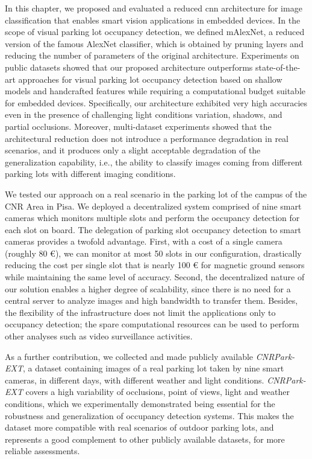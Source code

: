 In this chapter, we proposed and evaluated a reduced \acrlong{cnn} architecture for image classification that enables smart vision applications in embedded devices.
In the scope of visual parking lot occupancy detection, we defined mAlexNet, a reduced version of the famous AlexNet classifier, which is obtained by pruning layers and reducing the number of parameters of the original architecture.
Experiments on public datasets showed that our proposed architecture outperforms state-of-the-art approaches for visual parking lot occupancy detection based on shallow models and handcrafted features while requiring a computational budget suitable for embedded devices.
Specifically, our architecture exhibited very high accuracies even in the presence of challenging light conditions variation, shadows, and partial occlusions.
Moreover, multi-dataset experiments showed that the architectural reduction does not introduce a performance degradation in real scenarios, and it produces only a slight acceptable degradation of the generalization capability, i.e., the ability to classify images coming from different parking lots with different imaging conditions.

We tested our approach on a real scenario in the parking lot of the campus of the CNR Area in Pisa.
We deployed a decentralized system comprised of nine smart cameras which monitors multiple slots and perform the occupancy detection for each slot on board.
The delegation of parking slot occupancy detection to smart cameras provides a twofold advantage.
First, with a cost of a single camera (roughly 80 \euro{}), we can monitor at most 50 slots in our configuration, drastically reducing the cost per single slot that is nearly 100 \euro{} for magnetic ground sensors while maintaining the same level of accuracy.
Second, the decentralized nature of our solution enables a higher degree of scalability, since there is no need for a central server to analyze images and high bandwidth to transfer them.
Besides, the flexibility of the infrastructure does not limit the applications only to occupancy detection;
the spare computational resources can be used to perform other analyses such as video surveillance activities.

As a further contribution, we collected and made publicly available \emph{CNRPark-EXT}, a dataset containing images of a real parking lot taken by nine smart cameras, in different days, with different weather and light conditions.
\emph{CNRPark-EXT} covers a high variability of occlusions, point of views, light and weather conditions, which we experimentally demonstrated being essential for the robustness and generalization of occupancy detection systems.
This makes the dataset more compatible with real scenarios of outdoor parking lots, and represents a good complement to other publicly available datasets, for more reliable assessments.

